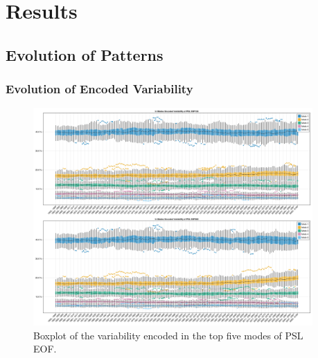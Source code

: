 \chapter{Results}
\label{ch:results}


\section{Evolution of Patterns}


\subsection{Evolution of Encoded Variability}

\begin{figure}
  \begin{center}
    \includegraphics[width=0.95\textwidth]{figures/mode_variability_psl_50seasons.png}
  \end{center}
  \caption{Boxplot of the variability encoded in the top five modes of PSL EOF.}\label{fig:psl mode variability}
\end{figure}

